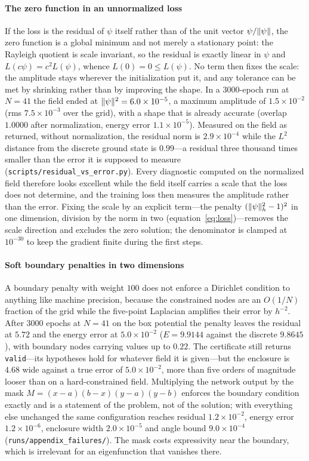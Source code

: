 \paragraph{The zero function in an unnormalized loss} If the loss is the
residual of $\psi$ itself rather than of the unit vector $\psi/\lVert \psi\rVert$,
the zero function is a global minimum and not merely a stationary point: the
Rayleigh quotient is scale invariant, so the residual is exactly linear in
$\psi$ and $L(c\psi)=c^2L(\psi)$, whence $L(0)=0\le L(\psi)$. No term then
fixes the scale: the amplitude stays wherever the initialization put it, and
any tolerance can be met by shrinking rather than by improving the shape. In a
$3000$-epoch run at $N=41$ the field ended at
$\lVert \psi\rVert^2=6.0\times10^{-5}$, a maximum amplitude of $1.5\times10^{-2}$ (rms
$7.5\times10^{-3}$ over the grid), with
a shape that is already accurate (overlap $1.0000$ after normalization, energy
error $1.1\times10^{-5}$). Measured on the field as returned, without
normalization, the residual norm is $2.9\times10^{-4}$ while the $L^2$
distance from the discrete ground state is $0.99$---a residual three thousand
times smaller than the error it is supposed to measure
(\texttt{scripts/residual\_vs\_error.py}). Every diagnostic
computed on the normalized field therefore looks excellent while the field
itself carries a scale that the loss does not determine, and the training loss
then measures the amplitude rather than the error.
Fixing the scale by an explicit term---the penalty $(\lVert \psi\rVert_h^2-1)^2$ in
one dimension, division by the norm in two (equation~\eqref{eq:loss})---removes
the scale direction and excludes the zero solution; the denominator is clamped
at $10^{-30}$ to keep the gradient finite during the first steps.

\paragraph{Soft boundary penalties in two dimensions} A boundary penalty with
weight $100$ does not enforce a Dirichlet condition to anything like machine
precision, because the constrained nodes are an $O(1/N)$ fraction of the grid
while the five-point Laplacian amplifies their error by $h^{-2}$. After
$3000$ epochs at $N=41$ on the box potential the penalty leaves the residual
at $5.72$ and the energy error at $5.0\times10^{-2}$ ($E=9.9144$ against the
discrete $9.8645$), with boundary nodes carrying values up to $0.22$. The
certificate still returns \texttt{valid}---its hypotheses hold for whatever
field it is given---but the enclosure is $4.68$ wide against a true error of
$5.0\times10^{-2}$, more than five orders of magnitude looser than on a
hard-constrained field. Multiplying the network output by the mask
$M=(x-a)(b-x)(y-a)(y-b)$ enforces the boundary condition exactly and is a
statement of the problem, not of the solution; with everything else unchanged
the same configuration reaches residual $1.2\times10^{-2}$, energy error
$1.2\times10^{-6}$, enclosure width $2.0\times10^{-5}$ and angle bound
$9.0\times10^{-4}$ (\texttt{runs/appendix\_failures/}). The mask costs
expressivity near the boundary, which is irrelevant for an eigenfunction that
vanishes there.

